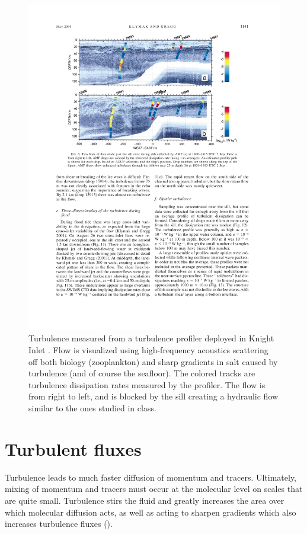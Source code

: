 \documentclass[11pt]{article}
\begin{document}
\begin{figure}[hbtp]
  \begin{center}
    \includegraphics[width=5in]{images/KlymakGregg04Fig6}
    \caption{Turbulence measured from a turbulence profiler deployed in Knight
Inlet \citep{klymakgregg04}.  Flow is visualized using high-frequency acoustics
scattering off both biology (zooplankton) and sharp gradients in salt caused by
turbulence (and of course the seafloor).  The colored tracks are turbulence
dissipation rates measured by the profiler.  The flow is from right to left,
and is blocked  by the sill creating a hydraulic flow similar to the ones
studied in class.}   
    \label{fig:KlymakGregg04Fig6}
  \end{center}
\end{figure}

\clearpage
\section{Turbulent fluxes}

Turbulence leads to much faster diffusion of momentum and tracers.  Ultimately,
mixing of momentum and tracers must occur at the molecular level on scales that
are quite small.   Turbulence stirs the fluid and greatly increases the area
over  which molecular diffusion acts, as well as acting to sharpen gradients
which also increases turbulence fluxes ().  
\end{document}
